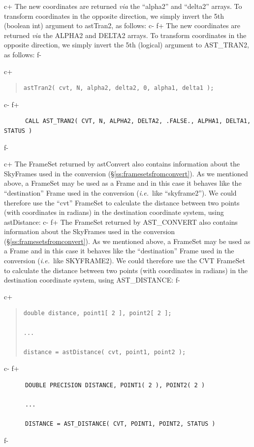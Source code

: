 \documentclass[twoside,11pt]{article}
\newcommand{\secref}[1]{\S\ref{#1}}
\newcommand{\secref}[1]{\ref{#1}}
\begin{document}
c+
The new coordinates are returned {\em{via}} the ``alpha2'' and
``delta2'' arrays.  To transform coordinates in the opposite
direction, we simply invert the 5th (boolean int) argument to
astTran2, as follows:
c-
f+
The new coordinates are returned {\em{via}} the ALPHA2 and DELTA2
arrays.  To transform coordinates in the opposite direction, we simply
invert the 5th (logical) argument to AST\_TRAN2, as follows:
f-

c+
\begin{quote}
\small
\begin{verbatim}
astTran2( cvt, N, alpha2, delta2, 0, alpha1, delta1 );
\end{verbatim}
\normalsize
\end{quote}
c-
f+
\small
\begin{verbatim}
      CALL AST_TRAN2( CVT, N, ALPHA2, DELTA2, .FALSE., ALPHA1, DELTA1, STATUS )
\end{verbatim}
\normalsize
f-

c+
The FrameSet returned by astConvert also contains information about
the SkyFrames used in the conversion
(\secref{ss:framesetsfromconvert}). As we mentioned above, a FrameSet
may be used as a Frame and in this case it behaves like the
``destination'' Frame used in the conversion ({\em{i.e.}}\ like
``skyframe2'').  We could therefore use the ``cvt'' FrameSet to
calculate the distance between two points (with coordinates in
radians) in the destination coordinate system, using astDistance:
c-
f+
The FrameSet returned by AST\_CONVERT also contains information about
the SkyFrames used in the conversion
(\secref{ss:framesetsfromconvert}). As we mentioned above, a FrameSet
may be used as a Frame and in this case it behaves like the
``destination'' Frame used in the conversion ({\em{i.e.}}\ like
SKYFRAME2). We could therefore use the CVT FrameSet to calculate the
distance between two points (with coordinates in radians) in the
destination coordinate system, using AST\_DISTANCE:
f-

c+
\begin{quote}
\small
\begin{verbatim}
double distance, point1[ 2 ], point2[ 2 ];

...

distance = astDistance( cvt, point1, point2 );
\end{verbatim}
\normalsize
\end{quote}
c-
f+
\small
\begin{verbatim}
      DOUBLE PRECISION DISTANCE, POINT1( 2 ), POINT2( 2 )

      ...

      DISTANCE = AST_DISTANCE( CVT, POINT1, POINT2, STATUS )
\end{verbatim}
\normalsize
f-
\end{document}
